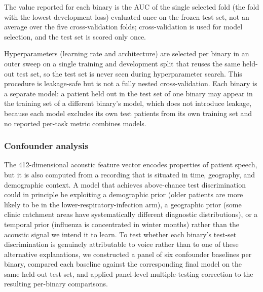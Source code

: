 \documentclass[utf8]{FrontiersinHarvard} %
\begin{document}
The value reported for each binary is the AUC of the single selected fold (the fold with the lowest development loss) evaluated once on the frozen test set, not an average over the five cross-validation folds; cross-validation is used for model selection, and the test set is scored only once.

Hyperparameters (learning rate and architecture) are selected per binary in an outer sweep on a single training and development split that reuses the same held-out test set, so the test set is never seen during hyperparameter search. This procedure is leakage-safe but is not a fully nested cross-validation. Each binary is a separate model: a patient held out in the test set of one binary may appear in the training set of a different binary's model, which does not introduce leakage, because each model excludes its own test patients from its own training set and no reported per-task metric combines models.

\subsubsection{Confounder analysis}
\label{sec:methods-confounder}
\label{sec:confounder-analysis}

The 412-dimensional acoustic feature vector encodes properties of patient speech, but it is also computed from a recording that is situated in time, geography, and demographic context. A model that achieves above-chance test discrimination could in principle be exploiting a demographic prior (older patients are more likely to be in the lower-respiratory-infection arm), a geographic prior (some clinic catchment areas have systematically different diagnostic distributions), or a temporal prior (influenza is concentrated in winter months) rather than the acoustic signal we intend it to learn. To test whether each binary's test-set discrimination is genuinely attributable to voice rather than to one of these alternative explanations, we constructed a panel of six confounder baselines per binary, compared each baseline against the corresponding final model on the same held-out test set, and applied panel-level multiple-testing correction to the resulting per-binary comparisons.
\end{document}
